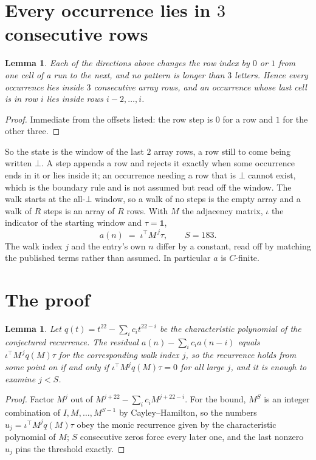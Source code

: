 \documentclass[11pt,a4paper]{article}
\theoremstyle{plain}
\newtheorem{lemma}[theorem]{Lemma}
\theoremstyle{definition}
\begin{document}
\section{Every occurrence lies in $3$ consecutive rows}

\begin{lemma}\label{lem:win}
Each of the directions above changes the row index by $0$ or $1$ from one cell of a run to the
next, and no pattern is longer than $3$ letters. Hence every occurrence lies inside $3$
consecutive array rows, and an occurrence whose last cell is in row $i$ lies inside rows
$i-2,\dots,i$.
\end{lemma}

\begin{proof}
Immediate from the offsets listed: the row step is $0$ for a row and $1$ for the other three.
\end{proof}

So the state is the window of the last $2$ array rows, a row still to come being written
$\bot$. A step appends a row and rejects it exactly when some occurrence ends in it or lies
inside it; an occurrence needing a row that is $\bot$ cannot exist, which is the boundary rule
and is not assumed but read off the window. The walk starts at the all-$\bot$ window, so a walk
of no steps is the empty array and a walk of $R$ steps is an array of $R$ rows. With $M$ the
adjacency matrix, $\iota$ the indicator of the starting window and $\tau=\mathbf{1}$,
\[
a(n)\;=\;\iota^{\!\top}M^{\,j}\tau ,\qquad S=183.
\]
The walk index $j$ and the entry's own $n$ differ by a constant, read off by matching the
published terms rather than assumed. In particular $a$ is $C$-finite.

\section{The proof}

\begin{lemma}\label{lem:crit}
Let $q(t)=t^{22}-\sum_i c_it^{22-i}$ be the characteristic polynomial of the
conjectured recurrence. The residual $a(n)-\sum_ic_ia(n-i)$ equals
$\iota^{\!\top}M^{\,j}q(M)\tau$ for the corresponding walk index $j$, so the recurrence
holds from some point on if and only if $\iota^{\!\top}M^{j}q(M)\tau=0$ for all large $j$,
and it is enough to examine $j<S$.
\end{lemma}

\begin{proof}
Factor $M^{j}$ out of $M^{j+22}-\sum_ic_iM^{j+22-i}$. For the bound, $M^{S}$
is an integer combination of $I,M,\dots,M^{S-1}$ by Cayley--Hamilton, so the numbers
$u_j=\iota^{\!\top}M^{j}q(M)\tau$ obey the monic recurrence given by the characteristic
polynomial of $M$; $S$ consecutive zeros force every later one, and the last nonzero $u_j$
pins the threshold exactly.
\end{proof}
\end{document}
